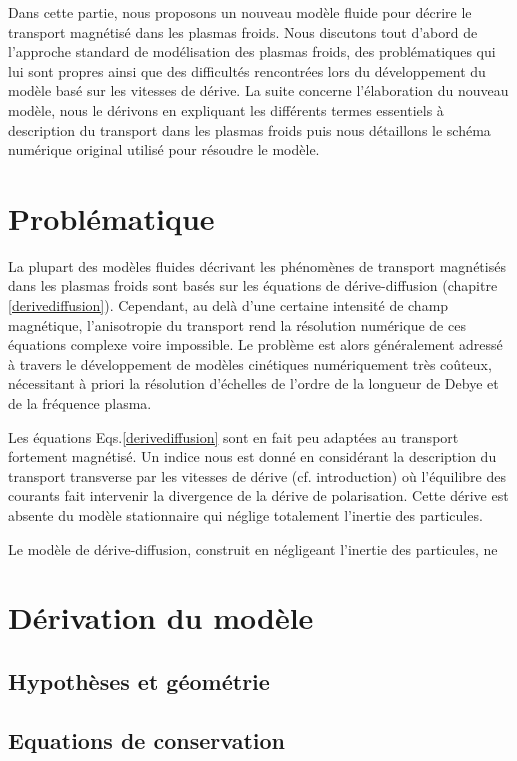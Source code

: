 Dans cette partie, nous proposons un nouveau modèle fluide pour décrire le
transport magnétisé dans les plasmas froids. Nous discutons tout d'abord de
l'approche standard de modélisation des plasmas froids, des problématiques qui
lui sont propres ainsi que des difficultés rencontrées lors du développement du
modèle basé sur les vitesses de dérive. La suite concerne l'élaboration du
nouveau modèle, nous le dérivons en expliquant les différents
termes essentiels à description du transport dans les plasmas froids puis nous
détaillons le schéma numérique original utilisé pour résoudre le modèle.
\section{Problématique}
La plupart des modèles fluides décrivant les phénomènes de transport
magnétisés dans les plasmas froids sont basés sur les équations de
dérive-diffusion (chapitre \ref{derivediffusion}). Cependant, au delà d'une
certaine intensité de champ magnétique, l'anisotropie du transport rend la résolution
numérique de ces équations complexe voire impossible. Le problème est alors
généralement adressé à travers le développement de
modèles cinétiques numériquement très coûteux, nécessitant à priori la
résolution d'échelles de l'ordre de la longueur de Debye et de la fréquence plasma.

Les équations Eqs.\ref{derivediffusion} sont en fait peu adaptées au
transport fortement magnétisé. Un indice nous est donné en considérant la
description du transport transverse par les vitesses de dérive (cf.
introduction) où l'équilibre des courants fait intervenir la divergence de
la dérive de polarisation. Cette dérive est absente du modèle stationnaire qui
néglige totalement l'inertie des particules.

Le modèle de dérive-diffusion, construit en négligeant l'inertie
des particules, ne 

\section{Dérivation du modèle}
\subsection{Hypothèses et géométrie}
\subsection{Equations de conservation}
